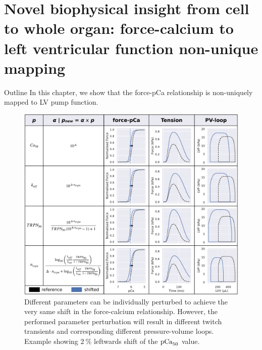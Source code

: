\chapter{Novel biophysical insight from cell to whole organ: force-calcium 
to left ventricular function non-unique mapping}\label{cha:chapter8}
%
%
%
\begin{remark}{Outline}
    In this chapter, we show that the force-pCa relationship is non-uniquely mapped to LV pump function.
\end{remark}



\begin{figure}[!ht]
    \myfloatalign
    \includegraphics[width=\textwidth]{figures/chapter08/1param_pCa50_same_shift.pdf}
    \caption{Different parameters can be individually perturbed to achieve the very same shift in the force-calcium relationship. However, the performed parameter perturbation will result in different twitch transients and corresponding different pressure-volume loops. Example showing $\SI{2}{\percent}$ leftwards shift of the $\textrm{pCa}_{50}$ value.}
    \label{fig:oneparamsameshifttab}
\end{figure}


